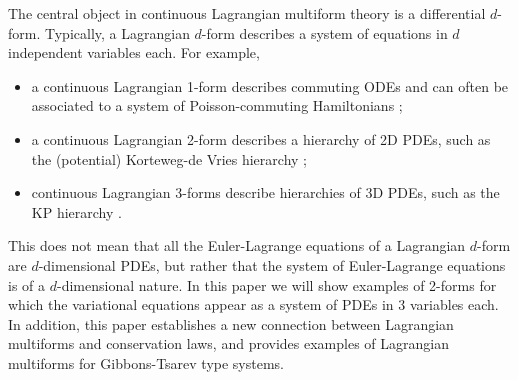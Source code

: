 \documentclass[12pt, a4paper]{article}
\theoremstyle{definition}
\begin{document}
The central object in continuous Lagrangian multiform theory is a differential $d$-form. Typically, a Lagrangian $d$-form describes a system of equations in $d$ independent variables each. For example,
\begin{itemize}
	\item a continuous Lagrangian 1-form describes commuting ODEs and can often be associated to a system of Poisson-commuting Hamiltonians \cite{yoo-kong2011discretetime, suris2013variational};
	\item a continuous Lagrangian 2-form describes a hierarchy of 2D PDEs, such as the (potential) Korteweg-de Vries hierarchy \cite{suris2016variational,suris2016lagrangian};
	\item continuous Lagrangian 3-forms describe hierarchies of 3D PDEs, such as the KP hierarchy \cite{sleigh2023lagrangian, nijhoff2023lagrangian}.
\end{itemize}
This does not mean that all the Euler-Lagrange equations of a Lagrangian $d$-form are $d$-dimensional PDEs, but rather that the system of Euler-Lagrange equations is of a $d$-dimensional nature. In this paper we will show examples of 2-forms for which the variational equations appear as a system of PDEs in 3 variables each. In addition, this paper establishes a new connection between Lagrangian multiforms and conservation laws, and provides examples of Lagrangian multiforms for Gibbons-Tsarev type systems.
\end{document}
